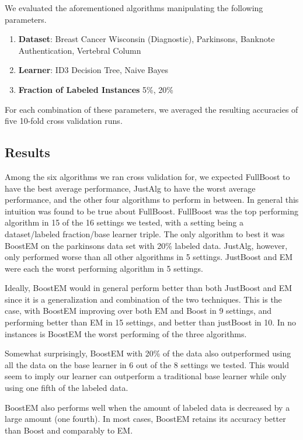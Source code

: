 \documentclass{sig-alternate}
\begin{document}
We evaluated the aforementioned algorithms manipulating the following parameters.

\begin{enumerate}
\item \textbf{Dataset}: Breast Cancer Wisconsin (Diagnostic), Parkinsons, Banknote Authentication, Vertebral Column
\item \textbf{Learner}: ID3 Decision Tree, Naive Bayes
\item \textbf{Fraction of Labeled Instances} 5\%, 20\%
\end{enumerate}

For each combination of these parameters, we averaged the resulting accuracies of five 10-fold cross validation runs. 

\subsection{Results}

 Among the six algorithms we ran cross validation for, we expected FullBoost to have the best average performance, JustAlg to
have the worst average performance, and the other four algorithms to perform in between. In general this intuition was found to be true about FullBoost.
FullBoost was the top performing algorithm in 15 of the 16 settings we tested, with a setting being a dataset/labeled fraction/base learner triple. The only algorithm to best it was BoostEM on the parkinsons data set
with 20\% labeled data. JustAlg, however, only performed worse than all other algorithms in 5 settings. JustBoost and EM were each the worst performing algorithm
in 5 settings.

Ideally, BoostEM would in general perform better than both JustBoost and EM since it is a generalization and combination of the two techniques. This is the case, 
with BoostEM improving over both EM and Boost in 9 settings, and performing better than EM in 15 settings, and better than justBoost in 10. In no instances is BoostEM 
the worst performing of the three algorithms.

Somewhat surprisingly, BoostEM with 20\% of the data also outperformed using all the data on the base learner in 6 out of the 8 settings we tested.  This would seem to imply our learner can outperform a traditional base learner while only using one fifth of the labeled data.

BoostEM also performs well when the amount of labeled data is decreased by a large amount (one fourth).  In most cases, BoostEM retains its accuracy better than Boost and comparably to EM.
\end{document}
